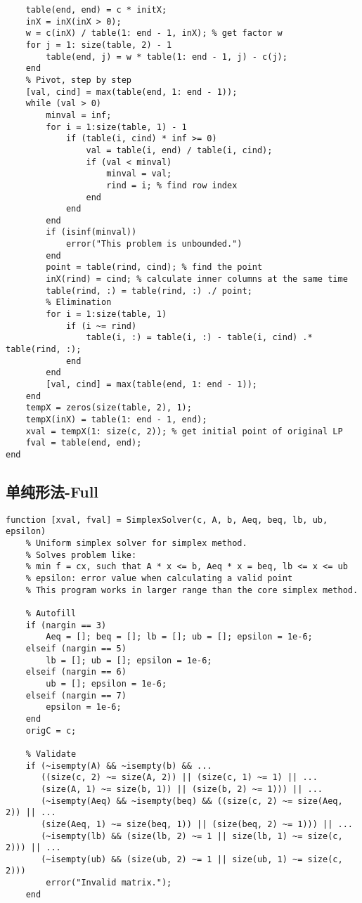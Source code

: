 \documentclass[bwprint, withouttitlepage, openfonts]{mathexpthesis}
\begin{document}
\begin{appendices}
\begin{verbatim}
    table(end, end) = c * initX;
    inX = inX(inX > 0);
    w = c(inX) / table(1: end - 1, inX); % get factor w
    for j = 1: size(table, 2) - 1
        table(end, j) = w * table(1: end - 1, j) - c(j);
    end
    % Pivot, step by step
    [val, cind] = max(table(end, 1: end - 1));
    while (val > 0)
        minval = inf;
        for i = 1:size(table, 1) - 1
            if (table(i, cind) * inf >= 0)
                val = table(i, end) / table(i, cind);
                if (val < minval)
                    minval = val;
                    rind = i; % find row index
                end
            end
        end
        if (isinf(minval))
            error("This problem is unbounded.")
        end
        point = table(rind, cind); % find the point
        inX(rind) = cind; % calculate inner columns at the same time
        table(rind, :) = table(rind, :) ./ point;
        % Elimination
        for i = 1:size(table, 1)
            if (i ~= rind)
                table(i, :) = table(i, :) - table(i, cind) .* table(rind, :); 
            end
        end
        [val, cind] = max(table(end, 1: end - 1));
    end
    tempX = zeros(size(table, 2), 1);
    tempX(inX) = table(1: end - 1, end);
    xval = tempX(1: size(c, 2)); % get initial point of original LP
    fval = table(end, end);
end
\end{verbatim}
\subsection{单纯形法-Full}
\begin{verbatim}
function [xval, fval] = SimplexSolver(c, A, b, Aeq, beq, lb, ub, epsilon)
    % Uniform simplex solver for simplex method.
    % Solves problem like:
    % min f = cx, such that A * x <= b, Aeq * x = beq, lb <= x <= ub
    % epsilon: error value when calculating a valid point
    % This program works in larger range than the core simplex method.

    % Autofill
    if (nargin == 3)
        Aeq = []; beq = []; lb = []; ub = []; epsilon = 1e-6;
    elseif (nargin == 5)
        lb = []; ub = []; epsilon = 1e-6;
    elseif (nargin == 6)
        ub = []; epsilon = 1e-6;
    elseif (nargin == 7)
        epsilon = 1e-6;
    end
    origC = c;
    
    % Validate
    if (~isempty(A) && ~isempty(b) && ... 
       ((size(c, 2) ~= size(A, 2)) || (size(c, 1) ~= 1) || ...
       (size(A, 1) ~= size(b, 1)) || (size(b, 2) ~= 1))) || ...
       (~isempty(Aeq) && ~isempty(beq) && ((size(c, 2) ~= size(Aeq, 2)) || ...
       (size(Aeq, 1) ~= size(beq, 1)) || (size(beq, 2) ~= 1))) || ...
       (~isempty(lb) && (size(lb, 2) ~= 1 || size(lb, 1) ~= size(c, 2))) || ...
       (~isempty(ub) && (size(ub, 2) ~= 1 || size(ub, 1) ~= size(c, 2)))
        error("Invalid matrix.");
    end
    

\end{verbatim}
\end{appendices}
\end{document}
